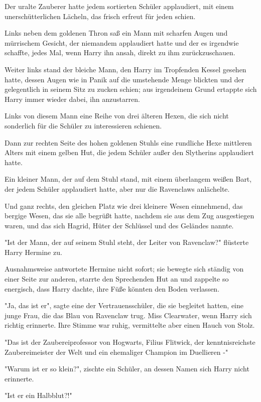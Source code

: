 {Der uralte Zauberer hatte jedem sortierten Schüler applaudiert, mit einem unerschütterlichen Lächeln, das frisch erfreut für jeden schien.

Links neben dem goldenen Thron saß ein Mann mit scharfen Augen und mürrischem Gesicht, der niemandem applaudiert hatte und der es irgendwie schaffte, jedes Mal, wenn Harry ihn ansah, direkt zu ihm zurückzuschauen.

Weiter links stand der bleiche Mann, den Harry im Tropfenden Kessel gesehen hatte, dessen Augen wie in Panik auf die umstehende Menge blickten und der gelegentlich in seinem Sitz zu zucken schien; aus irgendeinem Grund ertappte sich Harry immer wieder dabei, ihn anzustarren.

Links von diesem Mann eine Reihe von drei älteren Hexen, die sich nicht sonderlich für die Schüler zu interessieren schienen.

Dann zur rechten Seite des hohen goldenen Stuhls eine rundliche Hexe mittleren Alters mit einem gelben Hut, die jedem Schüler außer den Slytherins applaudiert hatte.

Ein kleiner Mann, der auf dem Stuhl stand, mit einem überlangem weißen Bart, der jedem Schüler applaudiert hatte, aber nur die Ravenclaws anlächelte.

Und ganz rechts, den gleichen Platz wie drei kleinere Wesen einnehmend, das bergige Wesen, das sie alle begrüßt hatte, nachdem sie aus dem Zug ausgestiegen waren, und das sich Hagrid, Hüter der Schlüssel und des Geländes nannte.

"Ist der Mann, der auf seinem Stuhl steht, der Leiter von Ravenclaw?" flüsterte Harry Hermine zu.

Ausnahmsweise antwortete Hermine nicht sofort; sie bewegte sich ständig von einer Seite zur anderen, starrte den Sprechenden Hut an und zappelte so energisch, dass Harry dachte, ihre Füße könnten den Boden verlassen.

"Ja, das ist er", sagte eine der Vertrauensschüler, die sie begleitet hatten, eine junge Frau, die das Blau von Ravenclaw trug. Miss Clearwater, wenn Harry sich richtig erinnerte. Ihre Stimme war ruhig, vermittelte aber einen Hauch von Stolz.

"Das ist der Zaubereiprofessor von Hogwarts, Filius Flitwick, der kenntnisreichste Zaubereimeister der Welt und ein ehemaliger Champion im Duellieren -"

"Warum ist er so klein?", zischte ein Schüler, an dessen Namen sich Harry nicht erinnerte.

"Ist er ein Halbblut?!"

}
